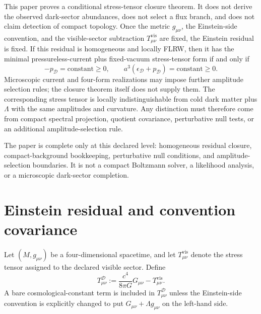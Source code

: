 \documentclass[
  aps,
  prd,
  reprint,
  superscriptaddress,
  floatfix,
  nofootinbib,
  longbibliography
]{revtex4-2}
\theoremstyle{plain}
\theoremstyle{definition}
\theoremstyle{remark}
\newcommand{\D}{\mathcal D}
\newcommand{\vis}{\mathrm{vis}}
\newcommand{\eps}{\epsilon}
\begin{document}
This paper proves a conditional stress-tensor closure theorem.  It does not
derive the observed dark-sector abundances, does not select a flux branch, and
does not claim detection of compact topology.  Once the metric
\(g_{\mu\nu}\), the Einstein-side convention, and the visible-sector subtraction
\(T^{\vis}_{\mu\nu}\) are fixed, the Einstein residual is fixed.  If this
residual is homogeneous and locally FLRW, then it has the minimal
pressureless-current plus fixed-vacuum stress-tensor form if and only if
\begin{equation}
-p_\D=\text{constant}\ge0,
\qquad
a^3(\eps_\D+p_\D)=\text{constant}\ge0 .
\label{eq:claim_boundary_closure}
\end{equation}
Microscopic current and four-form realizations may impose further amplitude
selection rules; the closure theorem itself does not supply them.  The
corresponding stress tensor is locally indistinguishable from cold dark matter
plus \(\Lambda\) with the same amplitudes and curvature.  Any distinction must
therefore come from compact spectral projection, quotient covariance, perturbative null tests,
or an additional amplitude-selection rule.

The paper is complete only at this declared level: homogeneous residual
closure, compact-background bookkeeping, perturbative null conditions, and
amplitude-selection boundaries.  It is not a compact Boltzmann solver, a
likelihood analysis, or a microscopic dark-sector completion.

\section{Einstein residual and convention covariance}

Let \((M,g_{\mu\nu})\) be a four-dimensional spacetime, and let
\(T^{\vis}_{\mu\nu}\) denote the stress tensor assigned to the declared visible
sector.  Define
\begin{equation}
\boxed{
T^\D_{\mu\nu}:=
\frac{c^4}{8\pi G}G_{\mu\nu}-T^{\vis}_{\mu\nu} .
}
\label{eq:primitive_residual_v5}
\end{equation}
A bare cosmological-constant term is included in \(T^\D_{\mu\nu}\) unless the
Einstein-side convention is explicitly changed to put \(G_{\mu\nu}+\Lambda
 g_{\mu\nu}\) on the left-hand side.
\end{document}
